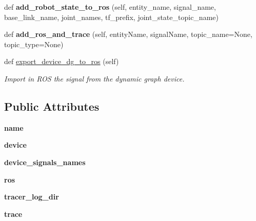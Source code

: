 \begin{DoxyCompactItemize}
def {\bfseries add\+\_\+robot\+\_\+state\+\_\+to\+\_\+ros} (self, entity\+\_\+name, signal\+\_\+name, base\+\_\+link\+\_\+name, joint\+\_\+names, tf\+\_\+prefix, joint\+\_\+state\+\_\+topic\+\_\+name)
\item 
\mbox{\label{classrobot_1_1Robot_a737de35c18b3bf050dc477da3a841970}} 
def {\bfseries add\+\_\+ros\+\_\+and\+\_\+trace} (self, entity\+Name, signal\+Name, topic\+\_\+name=None, topic\+\_\+type=None)
\item 
\mbox{\label{classrobot_1_1Robot_ad5787c862823008387c047da5f34dd7e}} 
def \hyperlink{classrobot_1_1Robot_ad5787c862823008387c047da5f34dd7e}{export\+\_\+device\+\_\+dg\+\_\+to\+\_\+ros} (self)
\begin{DoxyCompactList}\small\item\em Import in R\+OS the signal from the dynamic graph device. \end{DoxyCompactList}\end{DoxyCompactItemize}
\subsection*{Public Attributes}
\begin{DoxyCompactItemize}
\item 
\mbox{\label{classrobot_1_1Robot_a24273c64e4c3266dd075ead7cd570c58}} 
{\bfseries name}
\item 
\mbox{\label{classrobot_1_1Robot_ae90b19f45d0f60f5a9bcae2b96214ce7}} 
{\bfseries device}
\item 
\mbox{\label{classrobot_1_1Robot_a76c94351e17cf2da6a47f594db60bb14}} 
{\bfseries device\+\_\+signals\+\_\+names}
\item 
\mbox{\label{classrobot_1_1Robot_aa64d4907ff7bc8916ab94993e36e8e92}} 
{\bfseries ros}
\item 
\mbox{\label{classrobot_1_1Robot_a64ffbcaa3fa142fc15fb928f0a171609}} 
{\bfseries tracer\+\_\+log\+\_\+dir}
\item 
\mbox{\label{classrobot_1_1Robot_aafc575f3ec8bd5a21277cca9645df962}} 
{\bfseries trace}
\end{DoxyCompactItemize}
